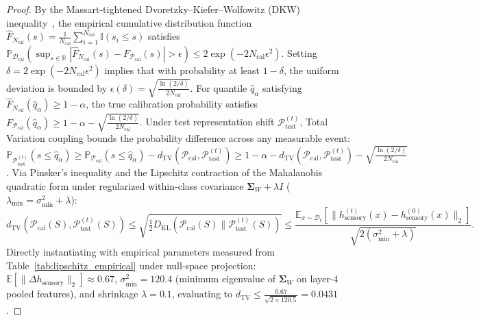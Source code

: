 \documentclass{article}
\begin{document}
\begin{proof}
By the Massart-tightened Dvoretzky--Kiefer--Wolfowitz (DKW) inequality~\cite{massart1990tight}, the empirical cumulative distribution function $\hat{F}_{N_{\mathrm{cal}}}(s) = \frac{1}{N_{\mathrm{cal}}} \sum_{i=1}^{N_{\mathrm{cal}}} \mathbb{I}(s_i \le s)$ satisfies $\mathbb{P}_{\mathcal{D}_{\mathrm{cal}}}\left( \sup_{s \in \mathbb{R}} |\hat{F}_{N_{\mathrm{cal}}}(s) - F_{\mathcal{P}_{\mathrm{cal}}}(s)| > \epsilon \right) \le 2 \exp(-2 N_{\mathrm{cal}} \epsilon^2)$.
Setting $\delta = 2 \exp(-2 N_{\mathrm{cal}} \epsilon^2)$ implies that with probability at least $1 - \delta$, the uniform deviation is bounded by $\epsilon(\delta) = \sqrt{\frac{\ln(2/\delta)}{2 N_{\mathrm{cal}}}}$. For quantile $\hat{q}_\alpha$ satisfying $\hat{F}_{N_{\mathrm{cal}}}(\hat{q}_\alpha) \ge 1 - \alpha$, the true calibration probability satisfies $F_{\mathcal{P}_{\mathrm{cal}}}(\hat{q}_\alpha) \ge 1 - \alpha - \sqrt{\frac{\ln(2/\delta)}{2 N_{\mathrm{cal}}}}$.
Under test representation shift $\mathcal{P}_{\mathrm{test}}^{(t)}$, Total Variation coupling bounds the probability difference across any measurable event: $\mathbb{P}_{\mathcal{P}_{\mathrm{test}}^{(t)}}(s \le \hat{q}_\alpha) \ge \mathbb{P}_{\mathcal{P}_{\mathrm{cal}}}(s \le \hat{q}_\alpha) - d_{\mathrm{TV}}(\mathcal{P}_{\mathrm{cal}}, \mathcal{P}_{\mathrm{test}}^{(t)}) \ge 1 - \alpha - d_{\mathrm{TV}}(\mathcal{P}_{\mathrm{cal}}, \mathcal{P}_{\mathrm{test}}^{(t)}) - \sqrt{\frac{\ln(2/\delta)}{2 N_{\mathrm{cal}}}}$.
Via Pinsker's inequality and the Lipschitz contraction of the Mahalanobis quadratic form under regularized within-class covariance $\mathbf{\Sigma}_W + \lambda I$ ($\lambda_{\min} = \sigma_{\min}^2 + \lambda$):
\begin{equation}
    d_{\mathrm{TV}}(\mathcal{P}_{\mathrm{cal}}(S), \mathcal{P}_{\mathrm{test}}^{(t)}(S)) \le \sqrt{\tfrac{1}{2} D_{\mathrm{KL}}(\mathcal{P}_{\mathrm{cal}}(S) \parallel \mathcal{P}_{\mathrm{test}}^{(t)}(S))} \le \frac{\mathbb{E}_{x \sim \mathcal{D}_t}[\|h_{\mathrm{sensory}}^{(t)}(x) - h_{\mathrm{sensory}}^{(0)}(x)\|_2]}{\sqrt{2(\sigma_{\min}^2 + \lambda)}}.
\end{equation}
Directly instantiating with empirical parameters measured from Table~\ref{tab:lipschitz_empirical} under null-space projection: $\mathbb{E}[\|\Delta h_{\mathrm{sensory}}\|_2] \approx 0.67$, $\sigma_{\min}^2 = 120.4$ (minimum eigenvalue of $\mathbf{\Sigma}_W$ on layer-4 pooled features), and shrinkage $\lambda = 0.1$, evaluating to $d_{\mathrm{TV}} \le \frac{0.67}{\sqrt{2 \times 120.5}} = 0.0431$.

\end{proof}
\end{document}
